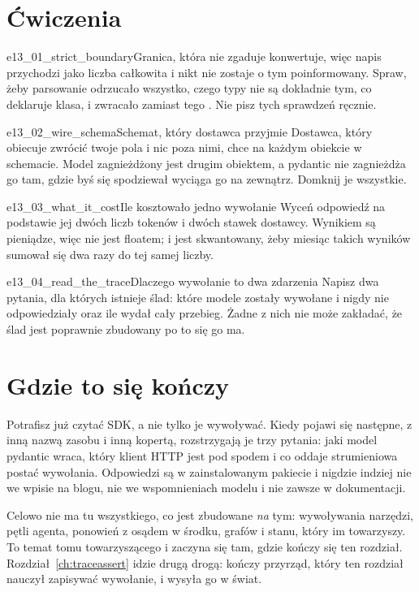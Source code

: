 \section{Ćwiczenia}
\label{sec:ai-exercises}

\begin{exercise}{e13_01_strict_boundary}{Granica, która nie zgaduje}
 konwertuje, więc napis  przychodzi jako liczba
całkowita i nikt nie zostaje o tym poinformowany. Spraw, żeby parsowanie
odrzucało wszystko, czego typy nie są dokładnie tym, co deklaruje klasa, i
zwracało zamiast tego . Nie pisz tych sprawdzeń ręcznie.
\end{exercise}

\begin{exercise}{e13_02_wire_schema}{Schemat, który dostawca przyjmie}
Dostawca, który obiecuje zwrócić twoje pola i nic poza nimi, chce
 na każdym obiekcie w schemacie. Model
zagnieżdżony jest drugim obiektem, a pydantic nie zagnieżdża go tam, gdzie
byś się spodziewał \dash{} wyciąga go na zewnątrz. Domknij je wszystkie.
\end{exercise}

\begin{exercise}{e13_03_what_it_cost}{Ile kosztowało jedno wywołanie}
\label{ex:ch13-cost}
Wyceń odpowiedź na podstawie jej dwóch liczb tokenów i dwóch stawek
dostawcy. Wynikiem są pieniądze, więc nie jest floatem; i jest
skwantowany, żeby miesiąc takich wyników sumował się dwa razy do tej samej
liczby.
\end{exercise}

\begin{exercise}{e13_04_read_the_trace}{Dlaczego wywołanie to dwa zdarzenia}
Napisz dwa pytania, dla których istnieje ślad: które modele zostały wywołane
i nigdy nie odpowiedziały oraz ile wydał cały przebieg. Żadne z nich nie może
zakładać, że ślad jest poprawnie zbudowany \dash{} po to się go ma.
\end{exercise}

\section{Gdzie to się kończy}
\label{sec:ai-stops}

Potrafisz już czytać SDK, a nie tylko je wywoływać. Kiedy pojawi się
następne, z inną nazwą zasobu i inną kopertą, rozstrzygają je trzy pytania:
jaki model pydantic wraca, który klient HTTP jest pod spodem i co oddaje
strumieniowa postać wywołania. Odpowiedzi są w zainstalowanym pakiecie i
nigdzie indziej \dash{} nie we wpisie na blogu, nie we wspomnieniach modelu i
nie zawsze w dokumentacji.

Celowo nie ma tu wszystkiego, co jest zbudowane \emph{na} tym: wywoływania
narzędzi, pętli agenta, ponowień z osądem w środku, grafów i stanu, który im
towarzyszy. To temat tomu towarzyszącego i zaczyna się tam, gdzie kończy się
ten rozdział. Rozdział~\ref{ch:traceassert} idzie drugą drogą: kończy
przyrząd, który ten rozdział nauczył zapisywać wywołanie, i wysyła go w
świat.
